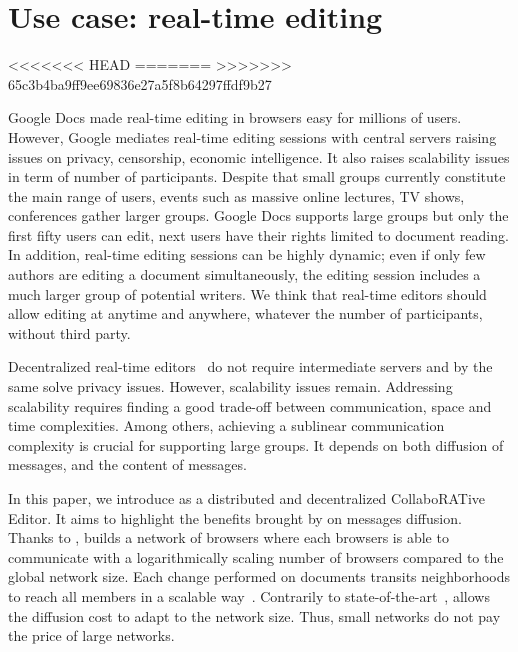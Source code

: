 
\section{Use case: real-time editing}
<<<<<<< HEAD
\label{sec:use-case}
=======
\label{sec:proposal2}
>>>>>>> 65c3b4ba9ff9ee69836e27a5f8b64297ffdf9b27

Google Docs made real-time editing in browsers easy for millions of
users. However, Google mediates real-time editing sessions with central servers
raising issues on privacy, censorship, economic intelligence. It also raises
scalability issues in term of number of participants.  Despite that small groups
currently constitute the main range of users, events such as massive online
lectures, TV shows, conferences gather larger groups.  Google Docs supports
large groups but only the first fifty users can edit, next users have their
rights limited to document reading. In addition, real-time editing sessions can
be highly dynamic; even if only few authors are editing a document
simultaneously, the editing session includes a much larger group of potential
writers. We think that real-time editors should allow editing at anytime and
anywhere, whatever the number of participants, without third party.

Decentralized real-time editors~\cite{oster2006data, sun1998operational,
  sun2009contextbased} do not require intermediate servers and by the same solve
privacy issues. However, scalability issues remain.  Addressing scalability
requires finding a good trade-off between communication, space and time
complexities. Among others, achieving a sublinear communication complexity is
crucial for supporting large groups.  It depends on both diffusion of messages,
and the content of messages.

In this paper, we introduce \CRATE as a distributed and decentralized
CollaboRATive Editor. It aims to highlight the benefits brought by \SPRAY on
messages diffusion. Thanks to \SPRAY, \CRATE builds a network of browsers where
each browsers is able to communicate with a logarithmically scaling number of
browsers compared to the global network size. Each change performed on documents
transits neighborhoods to reach all members in a scalable
way~\cite{birman1999bimodal}. Contrarily to
state-of-the-art~\cite{tolgyeski2009adaptive, voulgaris2005cyclon}, \SPRAY
allows the diffusion cost to adapt to the network size. Thus, small networks do
not pay the price of large networks.

